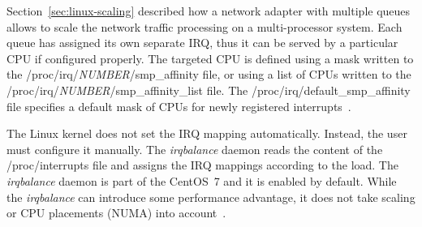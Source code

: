 Section~\ref{sec:linux-scaling} described how a network adapter with multiple queues
allows to scale the network traffic processing on a multi-processor system.
Each queue has assigned its own separate IRQ, thus it can be served by a particular CPU if configured properly.
The targeted CPU is defined using a mask written to the /proc/irq/{\it{NUMBER}}/smp\_affinity file,
or using a list of CPUs written to the /proc/irq/{\it{NUMBER}}/smp\_affinity\_list file.
The /proc/irq/default\_smp\_affinity file specifies a
default mask of CPUs for newly registered interrupts~\cite{kernel-doc-irq-affinity}.

The Linux kernel does not set the IRQ mapping automatically.
Instead, the user must configure it manually.
The {\it{irqbalance}} daemon reads the content of the /proc/interrupts file
and assigns the IRQ mappings according to the load.
The {\it{irqbalance}} daemon is part of the CentOS~7 and it is enabled by default.
While the {\it{irqbalance}} can introduce some performance advantage,
it does not take scaling or CPU placements (NUMA) into account~\cite{irqbalance-source}.
